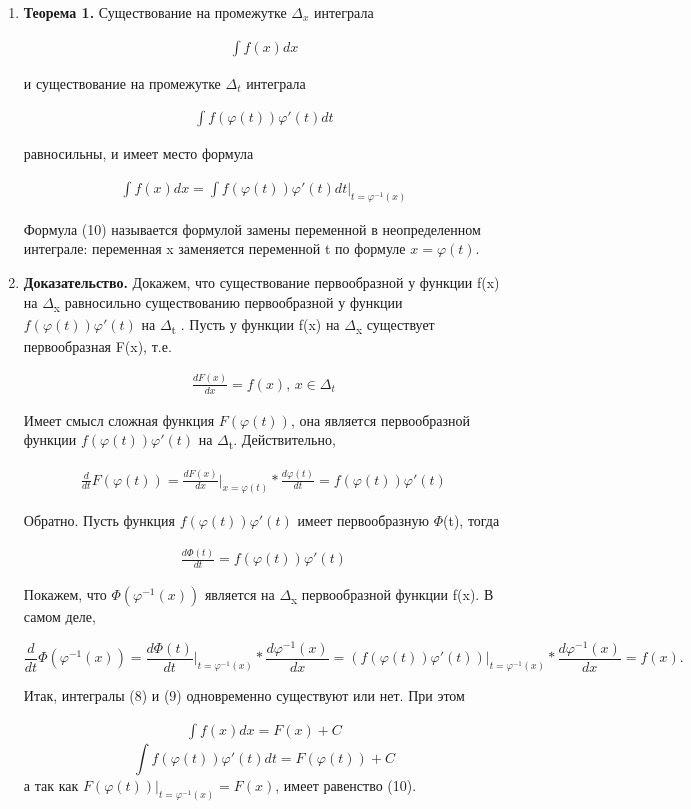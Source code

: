 \documentclass[11pt]{article}
\begin{document}
\begin{enumerate}
\item \textbf{Теорема 1.}
\label{sec:org429ce80}
Существование на промежутке \(\Delta_x\) интеграла

  \begin{eqnarray}
\int f(x)dx
  \end{eqnarray}

и существование на промежутке \(\Delta_t\) интеграла

  \begin{eqnarray}
\int f(\varphi(t))\varphi'(t)dt
  \end{eqnarray}

равносильны, и имеет место формула

  \begin{eqnarray}
\int f(x)dx=\int f(\varphi(t))\varphi'(t)dt\bigg|_{t=\varphi^{-1}(x)}
  \end{eqnarray}

Формула (10) называется формулой замены переменной в неопределенном интеграле:
переменная x заменяется переменной t по формуле \(x = \varphi(t)\).
\item \textbf{Доказательство.}
\label{sec:orgb25e7fe}
Докажем, что существование первообразной у функции f(x) на
 \(\Delta\)\textsubscript{x} равносильно существованию первообразной у функции \(f(\varphi(t))\varphi'(t)\)  на \(\Delta\)\textsubscript{t}
 . Пусть у функции f(x) на \(\Delta\)\textsubscript{x} существует первообразная F(x), т.е.

\begin{eqnarray}
\frac{dF(x)}{dx} = f(x)\text{, } x\in\Delta_t
\end{eqnarray}

Имеет смысл сложная функция \(F(\varphi(t))\), она является первообразной функции \(f(\varphi(t))\varphi'(t)\) на \(\Delta\)\textsubscript{t}. 
Действительно,

\begin{eqnarray}
\frac{d}{dt}F(\varphi(t))=\frac{dF(x)}{dx}\bigg|_{x=\varphi(t)}*\frac{d\varphi(t)}{dt}=f(\varphi(t))\varphi'(t)
\end{eqnarray}

Обратно. Пусть функция \(f(\varphi(t))\varphi'(t)\) имеет первообразную \(\Phi\)(t), тогда

\begin{eqnarray}
 \frac{d\Phi(t)}{dt}=f(\varphi(t))\varphi'(t)
 \end{eqnarray}

Покажем, что  \(\Phi(\varphi^{-1}(x))\) является на \(\Delta\)\textsubscript{x} первообразной функции f(x). В самом
деле,

$$
 \frac{d}{dt}\Phi(\varphi^{-1}(x))=\frac{d\Phi(t)}{dt}\bigg|_{t=\varphi^{-1}(x)}*\frac{d\varphi^{-1}(x)}{dx}=
(f(\varphi(t))\varphi'(t))\bigg|_{t=\varphi^{-1}(x)}*\frac{d\varphi^{-1}(x)}{dx}=f(x).
$$

Итак, интегралы (8) и (9) одновременно существуют или нет. При этом

\begin{eqnarray}
 \int f(x)dx=F(x)+C
 \end{eqnarray}
$$
\int f(\varphi(t))\varphi'(t)dt=F(\varphi(t))+C
$$
 а так как \(F(\varphi(t))|_{t=\varphi^{-1}(x)}=F(x)\), имеет равенство (10).
\end{enumerate}
\end{document}

